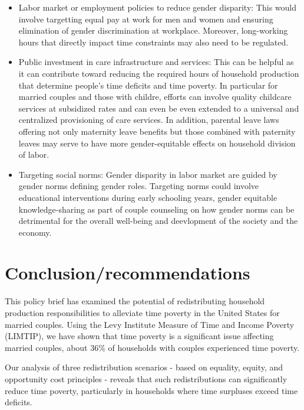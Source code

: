 \documentclass[
  11pt,
]{article}
\providecommand{\tightlist}{%
  \setlength{\itemsep}{0pt}\setlength{\parskip}{0pt}}\usepackage{longtable,booktabs,array}
\begin{document}
\begin{itemize}
\tightlist
\item
  Labor market or employment policies to reduce gender disparity: This
  would involve targetting equal pay at work for men and women and
  ensuring elimination of gender discrimination at workplace. Moreover,
  long-working hours that directly impact time constraints may also need
  to be regulated.
\item
  Public investment in care infrastructure and services: This can be
  helpful as it can contribute toward reducing the required hours of
  household production that determine people's time deficits and time
  poverty. In particular for married couples and those with childre,
  efforts can involve quality childcare services at subsidized rates and
  can even be even extended to a universal and centralized provisioning
  of care services. In addition, parental leave laws offering not only
  maternity leave benefits but those combined with paternity leaves may
  serve to have more gender-equitable effects on household division of
  labor.
\item
  Targeting social norms: Gender disparity in labor market are guided by
  gender norms defining gender roles. Targeting norms could involve
  educational interventions during early schooling years, gender
  equitable knowledge-sharing as part of couple counseling on how gender
  norms can be detrimental for the overall well-being and deevlopment of
  the society and the economy.
\end{itemize}

\section{Conclusion/recommendations}\label{conclusionrecommendations}

This policy brief has examined the potential of redistributing household
production responsibilities to alleviate time poverty in the United
States for married couples. Using the Levy Institute Measure of Time and
Income Poverty (LIMTIP), we have shown that time poverty is a
significant issue affecting married couples, about 36\% of households
with couples experienced time poverty.

Our analysis of three redistribution scenarios - based on equality,
equity, and opportunity cost principles - reveals that such
redistributions can significantly reduce time poverty, particularly in
households where time surpluses exceed time deficits.
\end{document}
